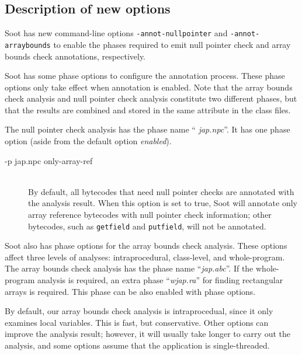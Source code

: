 \documentclass{article}
\begin{document}
\subsection{Description of new options}

Soot has new command-line options {\tt-annot-nullpointer} and
{\tt-annot-arraybounds} to enable the phases required to emit
null pointer check and array bounds check annotations, respectively.

Soot has some phase options to configure the annotation process.
These phase options only take effect when annotation is enabled.  
Note that the array bounds check analysis and null pointer
check analysis constitute two different phases, but that the results
are combined and stored in the same attribute in the class files. 

The null pointer check analysis has the phase name ``{\em
jap.npc}''. It has one phase option (aside from the default option
{\em enabled}).

\begin{description}

\item[-p jap.npc only-array-ref]\ \\
  By default, all bytecodes that need null pointer checks are 
  annotated with the analysis result. When this option is set to true, 
  Soot will annotate only array reference bytecodes with null 
  pointer check information; other bytecodes, such as {\tt getfield} 
  and {\tt putfield}, will not be annotated. 
\end{description}

Soot also has phase options for the array bounds check analysis.
These options affect three levels of analyses: intraprocedural,
class-level, and whole-program. The array bounds check analysis has
the phase name ``{\em jap.abc}''.  If the whole-program analysis is
required, an extra phase ``{\em wjap.ra}'' for finding rectangular
arrays is required.  This phase can be also enabled with
phase options.

By default, our array bounds check analysis is intraprocedual, since
it only examines local variables. This is fast, but
conservative. Other options can improve the analysis result; however,
it will usually take longer to carry out the analysis, and some
options assume that the application is single-threaded.
  
\end{document}
